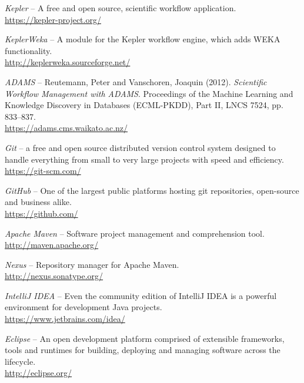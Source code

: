 \begin{thebibliography}{999}

		\textit{Kepler} -- A free and open source, scientific workflow application. \\
		\url{https://kepler-project.org/}{}

		\textit{KeplerWeka} -- A module for the Kepler workflow engine, which adds
		WEKA functionality. \\
		\url{http://keplerweka.sourceforge.net/}{}

		\textit{ADAMS} -- Reutemann, Peter and Vanschoren, Joaquin (2012).
		\textit{Scientific Workflow Management with ADAMS}. Proceedings
		of the Machine Learning and Knowledge Discovery in Databases
		(ECML-PKDD), Part II, LNCS 7524, pp. 833–837. \\
		\url{https://adams.cms.waikato.ac.nz/}{}

		\textit{Git} -- a free and open source distributed version
		control system designed to handle everything from small to
		very large projects with speed and efficiency. \\
		\url{https://git-scm.com/}{}

		\textit{GitHub} -- One of the largest public platforms hosting
		git repositories, open-source and business alike. \\
		\url{https://github.com/}{}

		\textit{Apache Maven} -- Software project management and comprehension tool.
		\\
		\url{http://maven.apache.org/}{}

		\textit{Nexus} -- Repository manager for Apache Maven. \\
		\url{http://nexus.sonatype.org/}{}

		\textit{IntelliJ IDEA} -- Even the community edition of IntelliJ IDEA
		is a powerful environment for development Java projects. \\
		\url{https://www.jetbrains.com/idea/}{}

		\textit{Eclipse} -- An open development platform comprised of extensible
		frameworks, tools and runtimes for building, deploying and managing
		software across the lifecycle. \\
		\url{http://eclipse.org/}{}


\end{thebibliography}
